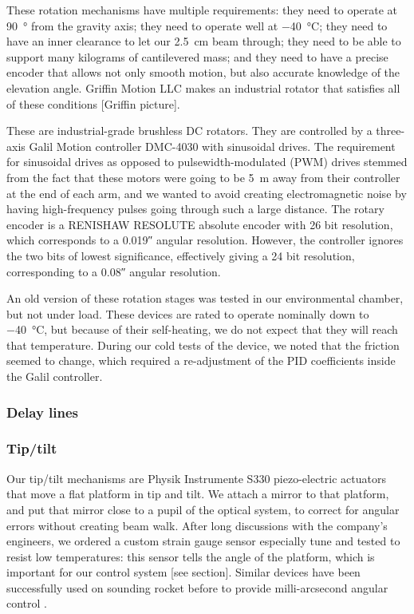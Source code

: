 These rotation mechanisms have multiple requirements: they need to operate at \SI{90}{\degree} from the gravity axis; they need to operate well at \SI{-40}{\celsius}; they need to have an inner clearance to let our \SI{2.5}{\cm} beam through; they need to be able to support many kilograms of cantilevered mass; and they need to have a precise encoder that allows not only smooth motion, but also accurate knowledge of the elevation angle. Griffin Motion LLC makes an industrial rotator that satisfies all of these conditions [Griffin picture].

These are industrial-grade brushless DC rotators. They are controlled by a three-axis Galil Motion controller DMC-4030 with sinusoidal drives. The requirement for sinusoidal drives as opposed to pulsewidth-modulated (PWM) drives stemmed from the fact that these motors were going to be \SI{5}{\meter} away from their controller at the end of each arm, and we wanted to avoid creating electromagnetic noise by having high-frequency pulses going through such a large distance. The rotary encoder is a RENISHAW RESOLUTE absolute encoder with 26 bit resolution, which corresponds to a \ang{;;0.019} angular resolution. However, the controller ignores the two bits of lowest significance, effectively giving a 24 bit resolution, corresponding to a \ang{;;0.08} angular resolution.

An old version of these rotation stages was tested in our environmental chamber, but not under load. These devices are rated to operate nominally down to \SI{-40}{\celsius}, but because of their self-heating, we do not expect that they will reach that temperature. During our cold tests of the device, we noted that the friction seemed to change, which required a re-adjustment of the PID coefficients inside the Galil controller. 

\subsubsection{Delay lines}
\subsubsection{Tip/tilt}

Our tip/tilt mechanisms are Physik Instrumente S330 piezo-electric actuators that move a flat platform in tip and tilt. We attach a mirror to that platform, and put that mirror close to a pupil of the optical system, to correct for angular errors without creating beam walk. After long discussions with the company's engineers, we ordered a custom strain gauge sensor especially tune and tested to resist low temperatures: this sensor tells the angle of the platform, which is important for our control system [see section]. Similar devices have been successfully used on sounding rocket before to provide milli-arcsecond angular control \citep{Mendillo:2012fh}. 

